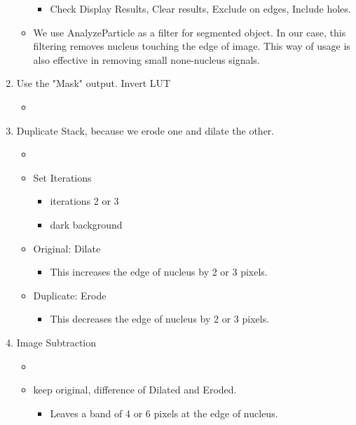 \begin{enumerate}
\begin{itemize}
\begin{itemize}
      \item Check Display Results, Clear results, Exclude on edges, Include holes. 
    \end{itemize}
    \item We use AnalyzeParticle as a filter for segmented object. In our case, this filtering removes nucleus touching the edge of image. This way of usage is also effective in removing small none-nucleus signals. 
  \end{itemize}
  \item Use the "Mask" output. Invert LUT
  \begin{itemize}
    \item {}
  \end{itemize}
  \item Duplicate Stack, because we erode one and dilate the other.
  \begin{itemize}
    \item {}
    \item Set Iterations 
    \begin{itemize}
      \item iterations 2 or 3
      \item dark background
    \end{itemize}
    \item Original: Dilate 
    \begin{itemize}
      \item This increases the edge of nucleus by 2 or 3 pixels. 
    \end{itemize}
    \item Duplicate: Erode 
    \begin{itemize}
      \item This decreases the edge of nucleus by 2 or 3 pixels. 
    \end{itemize}
  \end{itemize}
  \item Image Subtraction
  \begin{itemize}
    \item {}
    \item keep original, difference of Dilated and Eroded.
    \begin{itemize}
      \item Leaves a band of 4 or 6 pixels at the edge of nucleus. 
    \end{itemize} 
  \end{itemize}
\end{enumerate}

